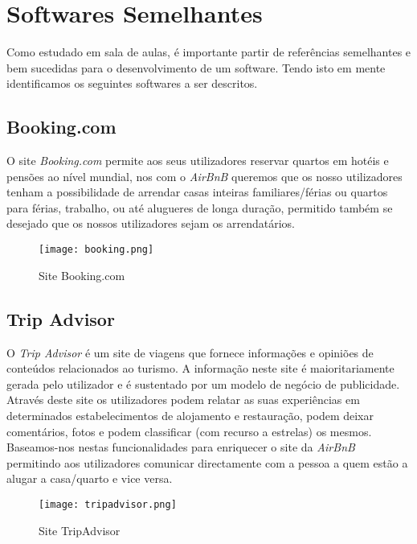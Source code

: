 \documentclass[a4paper]{article}
\begin{document}
\section{Softwares Semelhantes}
Como estudado em sala de aulas, é importante partir de referências semelhantes e bem sucedidas para o desenvolvimento de um software. Tendo isto em mente identificamos os seguintes softwares a ser descritos.
\subsection{Booking.com}
O site \textit{Booking.com} permite aos seus utilizadores reservar quartos em hotéis e pensões ao nível mundial, nos com o \textit{AirBnB} queremos que os nosso utilizadores tenham a possibilidade de arrendar casas inteiras familiares/férias ou quartos para férias, trabalho, ou até alugueres de longa duração, permitido também se desejado que os nossos utilizadores sejam os arrendatários. 

\begin{figure}[H]
    \centering
    \texttt{[image: booking.png]}    
    \caption{Site Booking.com\texttrademark}
\end{figure}

\newpage
\subsection{Trip Advisor}
O \textit{Trip Advisor} é um site de viagens que fornece informações e opiniões de conteúdos relacionados ao turismo. A informação neste site é maioritariamente gerada pelo utilizador e é sustentado por um modelo de negócio de publicidade.
Através deste site os utilizadores podem relatar as suas experiências em determinados estabelecimentos de alojamento e restauração, podem deixar comentários, fotos e podem classificar (com recurso a estrelas) os mesmos.
Baseamos-nos nestas funcionalidades para enriquecer o site da \textit{AirBnB} permitindo aos utilizadores comunicar directamente com a pessoa a quem estão a alugar a casa/quarto e vice versa. \cite{TripAdvisor}

\begin{figure}[H]
    \centering
    \texttt{[image: tripadvisor.png]}
    \caption{Site TripAdvisor\texttrademark}
    \label{fig:tripadv}
\end{figure}

\newpage
\end{document}
